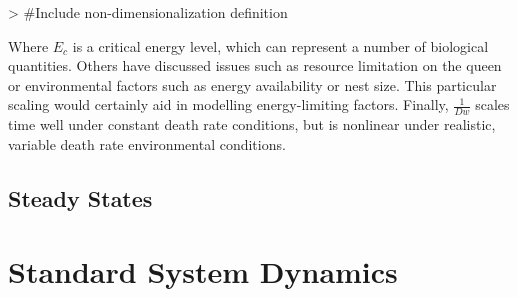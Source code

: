 \documentclass[12pt]{report}
\begin{document}
\begin{Schunk}
\begin{Sinput}
> #Include non-dimensionalization definition
\end{Sinput}
\end{Schunk}

Where $E_c$  is a critical energy level, which can represent a number of biological quantities. Others have discussed issues such as resource limitation on the queen \cite{mitesser2007optimal} or environmental factors such as energy availability or nest size. This particular scaling would certainly aid in modelling energy-limiting factors. Finally, $\frac{1}{Dw}$ scales time well under constant death rate conditions, but is nonlinear under realistic, variable death rate environmental conditions.

\subsection*{Steady States}

\section*{Standard System Dynamics}

\end{document}
